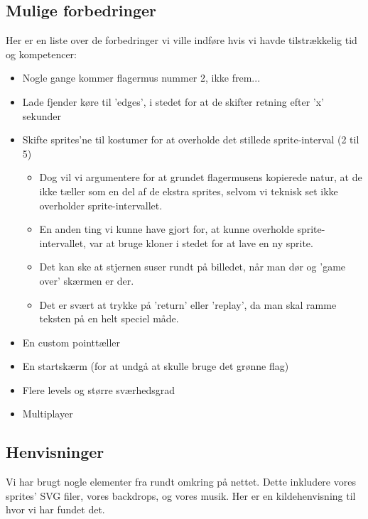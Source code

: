 \documentclass[12pt,a4paper]{article}
\begin{document}
\subsection{Mulige forbedringer}
Her er en liste over de forbedringer vi ville indføre hvis vi havde tilstrækkelig tid og kompetencer:  
\begin{itemize}
\item Nogle gange kommer flagermus nummer 2, ikke frem...
  \item Lade fjender køre til 'edges', i stedet for at de skifter retning efter 'x' sekunder
  \item Skifte sprites'ne til kostumer for at overholde det stillede sprite-interval (2 til 5)
  \begin{itemize}
      \item Dog vil vi argumentere for at grundet flagermusens kopierede natur, at de ikke tæller som en del af de ekstra sprites, selvom vi teknisk set ikke overholder sprite-intervallet. 
      \item En anden ting vi kunne have gjort for, at kunne overholde sprite-intervallet, var at bruge kloner i stedet for at lave en ny sprite. 
      \item Det kan ske at stjernen suser rundt på billedet, når man dør og 'game over' skærmen er der. 
      \item Det er svært at trykke på 'return' eller 'replay', da man skal ramme teksten på en helt speciel måde.
  \end{itemize}
  \item En custom pointtæller
  \item En startskærm (for at undgå at skulle bruge det grønne flag)
  \item Flere levels og større sværhedsgrad
  \item Multiplayer
\end{itemize}


\subsection{Henvisninger}

Vi har brugt nogle elementer fra rundt omkring på nettet. Dette inkludere vores sprites' SVG filer, vores backdrops, og vores musik. Her er en kildehenvisning til hvor vi har fundet det.
\end{document}
